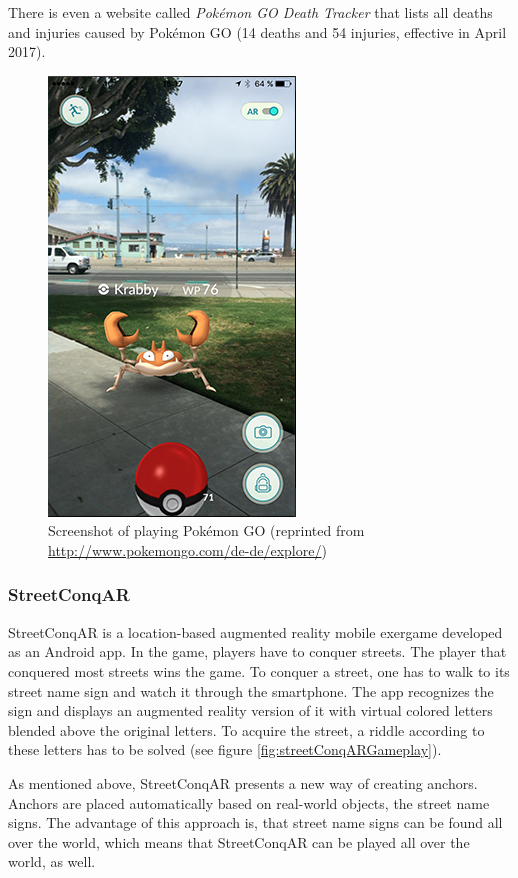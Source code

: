 There is even a website called \emph{Pok\'{e}mon GO Death Tracker} \citep{PokemonGoDeathTracker} that lists all deaths and injuries caused by Pok\'{e}mon GO (14 deaths and 54 injuries, effective in April 2017).

\begin{figure}[bth]
  \centering
        \includegraphics[width=.45\linewidth]{gfx/pokemon_go_gameplay}
        \caption{Screenshot of playing Pok\'{e}mon GO (reprinted from \url{http://www.pokemongo.com/de-de/explore/})}
        \label{fig:pokemonGOGameplay}
\end{figure}

\subsubsection{StreetConqAR}
StreetConqAR \citep{hock2014augmented} is a location-based augmented reality mobile exergame developed as an Android app. In the game, players have to conquer streets. The player that conquered most streets wins the game. To conquer a street, one has to walk to its street name sign and watch it through the smartphone. The app recognizes the sign and displays an augmented reality version of it with virtual colored letters blended above the original letters. To acquire the street, a riddle according to these letters has to be solved (see figure \ref{fig:streetConqARGameplay}).

As mentioned above, StreetConqAR presents a new way of creating anchors. Anchors are placed automatically based on real-world objects, the street name signs. The advantage of this approach is, that street name signs can be found all over the world, which means that StreetConqAR can be played all over the world, as well.

